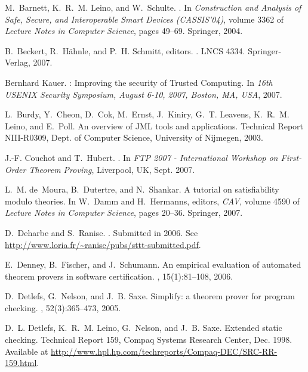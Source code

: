 \documentclass{acm_proc_article-sp}
\theoremstyle{nonumberplain}
\begin{document}
\begin{thebibliography}{10}

M.~Barnett, K.~R.~M. Leino, and W.~Schulte.
.
\newblock In {\em Construction and Analysis of Safe, Secure, and Interoperable
  Smart Devices (CASSIS'04)}, volume 3362 of {\em Lecture Notes in Computer
  Science}, pages 49--69. Springer, 2004.

B.~Beckert, R.~H\"ahnle, and P.~H. Schmitt, editors.
.
\newblock LNCS 4334. Springer-Verlag, 2007.

{B}ernhard {K}auer.
: {I}mproving the security of {T}rusted {C}omputing.
\newblock In {\em 16th {USENIX} {S}ecurity {S}ymposium, {A}ugust 6-10, 2007,
  {B}oston, {MA}, {USA}}, 2007.

L.~Burdy, Y.~Cheon, D.~Cok, M.~Ernst, J.~Kiniry, G.~T. Leavens, K.~R.~M. Leino,
  and E.~Poll.
\newblock An overview of {JML} tools and applications.
\newblock Technical Report NIII-R0309, Dept. of Computer Science, University of
  Nijmegen, 2003.

J.-F. Couchot and T.~Hubert.
.
\newblock In {\em FTP 2007 - International Workshop on First-Order Theorem
  Proving}, Liverpool, UK, Sept. 2007.

L.~M. de~Moura, B.~Dutertre, and N.~Shankar.
\newblock A tutorial on satisfiability modulo theories.
\newblock In W.~Damm and H.~Hermanns, editors, {\em CAV}, volume 4590 of {\em
  Lecture Notes in Computer Science}, pages 20--36. Springer, 2007.

D.~Deharbe and S.~Ranise.
.
\newblock Submitted in 2006. See
  \url{http://www.loria.fr/~ranise/pubs/sttt-submitted.pdf}.

E.~Denney, B.~Fischer, and J.~Schumann.
\newblock An empirical evaluation of automated theorem provers in software
  certification.
,
  15(1):81--108, 2006.

D.~Detlefs, G.~Nelson, and J.~B. Saxe.
\newblock Simplify: a theorem prover for program checking.
, 52(3):365--473, 2005.

D.~L. Detlefs, K.~R.~M. Leino, G.~Nelson, and J.~B. Saxe.
\newblock Extended static checking.
\newblock Technical Report 159, Compaq Systems Research Center, Dec. 1998.
\newblock Available at
\url{http://www.hpl.hp.com/techreports/Compaq-DEC/SRC-RR-159.html}.


\end{thebibliography}
\end{document}
